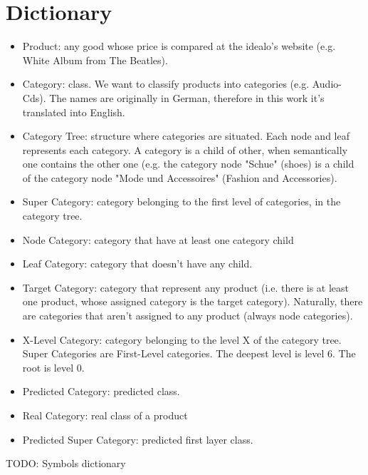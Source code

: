 \chapter{Dictionary\label{cha:dict}}

\begin{itemize}
    \item Product: any good whose price is compared at the idealo's website (e.g. White Album from The Beatles).
    \item Category: class. We want to classify products into categories (e.g. Audio-Cds). The names are originally in German, therefore in this work it's translated into English.
    \item Category Tree: structure where categories are situated. Each node and leaf represents each category. A category is a child of other, when semantically one contains the other one (e.g. the category node "Schue" (shoes) is a child of the category node "Mode und Accessoires" (Fashion and Accessories).
    \item Super Category: category belonging to the first level of categories, in the category tree.
    \item Node Category: category that have at least one category child
    \item Leaf Category: category that doesn't have any child.
    \item Target Category: category that represent any product (i.e. there is at least one product, whose assigned category is the target category). Naturally, there are categories that aren't assigned to any product (always node categories).
    \item X-Level Category: category belonging to the level X of the category tree. Super Categories are First-Level categories. The deepest level is level 6. The root is level 0.
    \item Predicted Category: predicted class.
    \item Real Category: real class of a product
    \item Predicted Super Category: predicted first layer class.
\end{itemize}

TODO: Symbols dictionary

